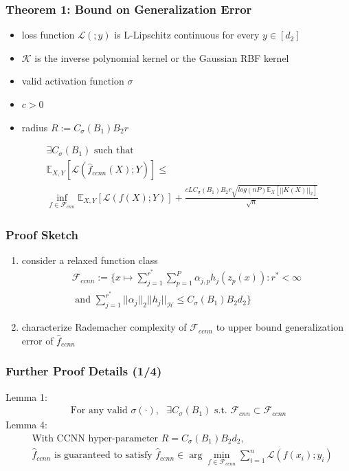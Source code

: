 \documentclass[hyperref={colorlinks}]{beamer}
\begin{document}
\begin{frame}
	\frametitle{Theorem 1: Bound on Generalization Error}
		\begin{itemize}
			\item loss function $\mathcal{L}(;y)$ is L-Lipschitz continuous for every $y \in [d_2]$
			\item $\mathcal{K}$ is the inverse polynomial kernel or the Gaussian RBF kernel
			\item valid activation function $\sigma$
			\item $c>0$
			\item radius $R:=C_\sigma(B_1)B_2r$
		\end{itemize}
	\begin{align*}
		&\exists C_\sigma(B_1) \text{ such that } \\
		&\mathbb{E}_{X,Y}[\mathcal{L}(\hat{f}_{ccnn}(X);Y)]\leq \\ 
		&\inf\limits_{f\in \mathcal{F}_{cnn}} \mathbb{E}_{X,Y}[\mathcal{L}(f(X);Y)]+ \frac{cLC_{\sigma}(B_1)B_2 r\sqrt{log(nP)\mathbb{E}_X[||K(X)||_2]}}{\sqrt{n}}
	\end{align*}	
\end{frame}

\begin{frame}
	\frametitle{Proof Sketch}
	\begin{enumerate}
		\item consider a relaxed function class
		\begin{align*}
			\mathcal{F}_{ccnn}:=\Big\{x\mapsto \sum_{j = 1}^{r^*} \sum_{p = 1}^P \alpha_{j, p} h_j(z_p(x)) : r^*<\infty \\ 
			\text{ and } \sum_{j = 1}^{r^*} ||\alpha_j||_2||h_j||_{\mathcal{H}}\leq C_{\sigma}(B_1)B_2d_2 \Big\}
		\end{align*}
		\item characterize Rademacher complexity of $\mathcal{F}_{ccnn}$ to upper bound generalization error of $\hat{f}_{ccnn}$
	\end{enumerate}
\end{frame}

\begin{frame}
	\frametitle{Further Proof Details (1/4)}
	Lemma 1:
	\begin{align*}
		\text{For any valid } \sigma(\cdot), \text{ } \exists C_{\sigma}(B_1) \text{ s.t. } \mathcal{F}_{cnn}\subset\mathcal{F}_{ccnn}
	\end{align*}
	Lemma 4:
	\begin{align*}
		&\text{With CCNN hyper-parameter } R=C_\sigma(B_1)B_2d_2, \\
		&\hat{f}_{ccnn} \text{ is guaranteed to satisfy } \hat{f}_{ccnn} \in \arg\min\limits_{f\in\mathcal{F}_{ccnn}} \sum\limits_{i=1}^{n} \mathcal{L}(f(x_i);y_i)
	\end{align*}
\end{frame}
\end{document}

